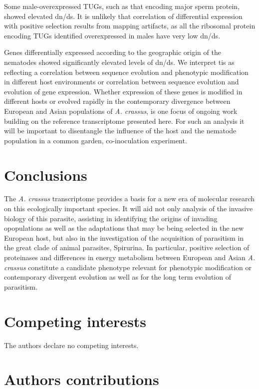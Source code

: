 \documentclass[10pt]{bmc_article}
\newenvironment{bmcformat}{\begin{raggedright}\baselineskip20pt\sloppy\setboolean{publ}{false}}{\end{raggedright}\baselineskip20pt\sloppy}
\begin{document}
\begin{bmcformat}
Some male-overexpressed TUGs, such as that encoding major sperm
protein, showed elevated dn/ds. It is unlikely that correlation of
differential expression with positive selection results from mapping
artifacts, as all the ribosomal protein encoding TUGs identified
overexpressed in males have very low dn/ds.

Genes differentially expressed according to the geographic origin of
the nematodes showed significantly elevated levels of dn/ds. We
interpret tis as reflecting a correlation between sequence evolution
and phenotypic modification in different host environments or
correlation between sequence evolution and evolution of gene
expression. Whether expression of these genes is modified in different
hosts or evolved rapidly in the contemporary divergence between
European and Asian populations of \textit{A. crassus}, is one focus of
ongoing work building on the reference transcriptome presented
here. For such an analysis it will be important to disentangle the
influence of the host and the nematode population in a common garden,
co-inoculation experiment.

\section*{Conclusions }

The \textit{A. crassus} transcriptome provides a basis for a new era
of molecular research on this ecologically important species. It will
aid not only analysis of the invasive biology of this parasite,
assisting in identifying the origins of invading opopulations as well
as the adaptations that may be being selected in the new European
host, but also in the investigation of the acquisition of parasitism
in the great clade of animal parasites, Spirurina. In particular,
positive selection of proteinases and differences in energy metabolism
between European and Asian \textit{A. crassus} constitute a candidate
phenotype relevant for phenotypic modification or contemporary
divergent evolution as well as for the long term evolution of
parasitism.

\section*{Competing interests}
The authors declare no competing interests.

\section*{Authors contributions}


\end{bmcformat}
\end{document}
